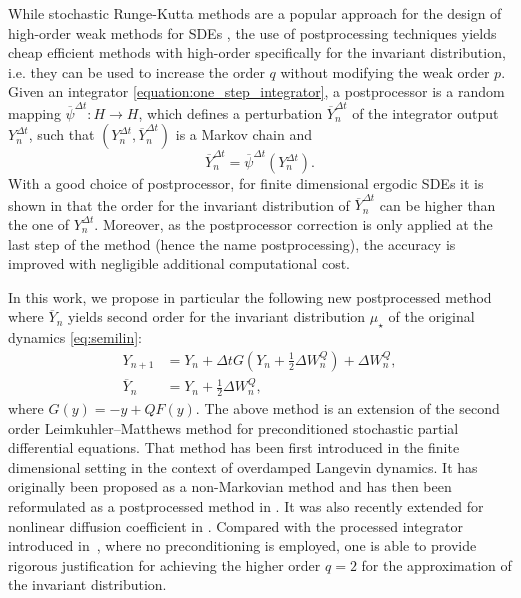 \documentclass[11pt]{amsart}
\begin{document}
While stochastic Runge-Kutta methods are a popular approach for the design of high-order weak methods for SDEs \cite{Burrage00oco}, the use of postprocessing techniques \cite{Brehier_Vilmart:16,Vilmart15pif} yields cheap efficient methods with high-order specifically for the invariant distribution, i.e. they can be used to increase the order $q$ without modifying the weak order $p$.
Given an integrator \eqref{equation:one_step_integrator}, a postprocessor is a random mapping $\overline{\psi}^{\Delta t}:H\to H$, which defines a perturbation $\overline{Y}_n^{\Delta t}$ of the integrator output $Y_n^{\Delta t}$, such that $(Y_n^{\Delta t},\overline{Y}_n^{\Delta t})$ is a Markov chain and
\[
\overline{Y}_n^{\Delta t}=\overline{\psi}^{\Delta t}(Y_n^{\Delta t}).
\]
With a good choice of postprocessor, for finite dimensional ergodic SDEs it is shown in \cite{Vilmart15pif} that the order for the invariant distribution of $\overline{Y}_n^{\Delta t}$ can be higher than the one of $Y_n^{\Delta t}$.
Moreover, as the postprocessor correction is only applied at the last step of the method (hence the name postprocessing), the accuracy is improved with negligible additional computational cost.

In this work, we propose in particular the following new postprocessed method where $\overline{Y}_n$ yields second order for the invariant distribution $\mu_\star$ of the original dynamics \eqref{eq:semilin}:
\begin{align*}
Y_{n+1}&=Y_n+\Delta tG(Y_n+\frac12\Delta W_n^Q)+\Delta W_n^Q,\\
\overline{Y}_n&=Y_n+\frac12\Delta W_n^Q,
\end{align*}
where $G(y)=-y+QF(y)$.
The above method is an extension of the second order Leimkuhler--Matthews method \cite{Leimkuhler13rco, Leimkuhler14otl} for preconditioned stochastic partial differential equations. That method has been first introduced in the finite dimensional setting in the context of overdamped Langevin dynamics. It has originally been proposed as a non-Markovian method and has then been reformulated as a postprocessed method in \cite{Vilmart15pif}.
It was also recently extended for nonlinear diffusion coefficient in \cite{Bronasco2025PhD, Bronasco25els}. Compared with the processed integrator introduced in~\cite{Brehier_Vilmart:16}, where no preconditioning is employed, one is able to provide rigorous justification for achieving the higher order $q=2$ for the approximation of the invariant distribution.
\end{document}
